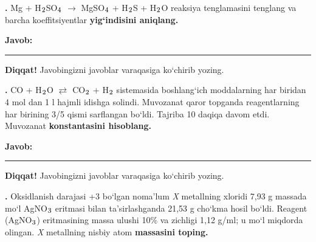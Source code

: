 \documentclass[11pt,a4paper]{article}
\renewcommand{\textsubscript}[1]{\ensuremath{_{\text{\fontsize{8}{8}\selectfont #1}}}}
\newcommand{\qn}[1]{\textbf{\fontsize{11.5}{13}\selectfont #1}}
\newcommand{\qsep}{\par\vspace{13pt}}
\newcommand{\javob}{\par\nopagebreak[4]\smallskip\noindent\textbf{Javob:} \rule[-2pt]{7.5cm}{0.4pt}\par\smallskip\noindent\textbf{Diqqat!} Javobingizni javoblar varaqasiga ko`chirib yozing.\par\medskip}
\begin{document}
\medskip
\noindent\setlength{\fboxsep}{0pt}
\par\bigskip
\noindent\qn{36.} Mg + H\textsubscript{2}SO\textsubscript{4} $\to$ MgSO\textsubscript{4} + H\textsubscript{2}S + H\textsubscript{2}O reaksiya tenglamasini tenglang va barcha koeffitsiyentlar \textbf{yig`indisini aniqlang.}
\javob\qsep
\noindent\qn{37.} CO + H\textsubscript{2}O $\rightleftarrows$ CO\textsubscript{2} + H\textsubscript{2} sistemasida boshlang`ich moddalarning har biridan 4 mol dan 1 l hajmli idishga solindi. Muvozanat qaror topganda reagentlarning har birining 3/5 qismi sarflangan bo`ldi. Tajriba 10 daqiqa davom etdi. Muvozanat \textbf{konstantasini hisoblang.}
\javob\qsep
\noindent\qn{38.} Oksidlanish darajasi +3 bo`lgan noma'lum \textit{X} metallning xloridi 7,93 g massada mo`l AgNO\textsubscript{3} eritmasi bilan ta'sirlashganda 21,53 g cho`kma hosil bo`ldi. Reagent (AgNO\textsubscript{3}) eritmasining massa ulushi 10\% va zichligi 1,12 g/ml; u mo`l miqdorda olingan. \textit{X} metallning nisbiy atom \textbf{massasini toping.}
\end{document}

